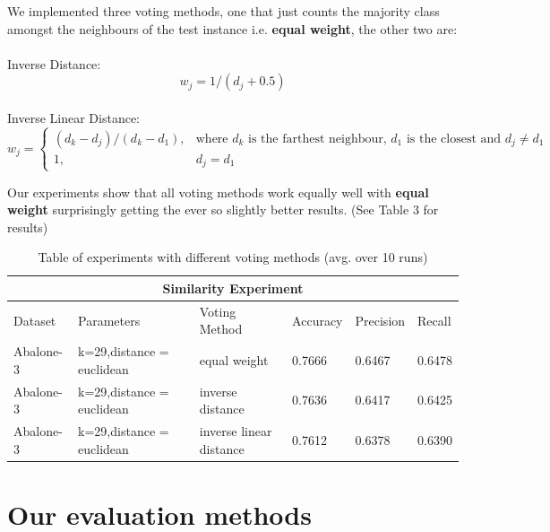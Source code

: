 We implemented three voting methods, one that just counts the majority class amongst the neighbours of the test instance i.e. {\bf equal weight}, the other two are: 
\\\\
Inverse Distance: 
\begin{equation}
w_j = 1/(d_j + 0.5)  
\end{equation}
\\
Inverse Linear Distance:
\begin{equation}
w_j = 
\begin{cases}
    (d_k - d_j)/(d_k - d_1),& \text{where } d_k \text{ is the farthest neighbour, }  d_1 \text{ is the closest and } d_j \neq d_1\\
    1,              &  d_j = d_1 
\end{cases}
\end{equation}

Our experiments show that all voting methods work equally well with {\bf equal weight} surprisingly getting the ever so slightly better results. (See Table 3 for results)

\begin{table}[h]
\centering
\begin{tabular}{|p{2cm}|p{4.5cm}||p{2cm}|p{1.5cm}|p{1.5cm}|p{1.5cm}|}
 \hline
 \multicolumn{6}{|c|}{Similarity Experiment} \\
 \hline
 Dataset & Parameters & Voting Method & Accuracy & Precision & Recall\\
 \hline
 Abalone-3 & k=29,distance = euclidean &   equal weight & 0.7666  & 0.6467 & 0.6478\\
 \hline
 Abalone-3 & k=29,distance = euclidean & inverse distance & 0.7636 & 0.6417 & 0.6425\\
 \hline
 Abalone-3 & k=29,distance = euclidean &  inverse linear distance & 0.7612 & 0.6378 & 0.6390\\ 
 \hline

\end{tabular}
\caption{Table of experiments with different voting methods (avg. over 10 runs)}
\end{table}

\section{Our evaluation methods}

